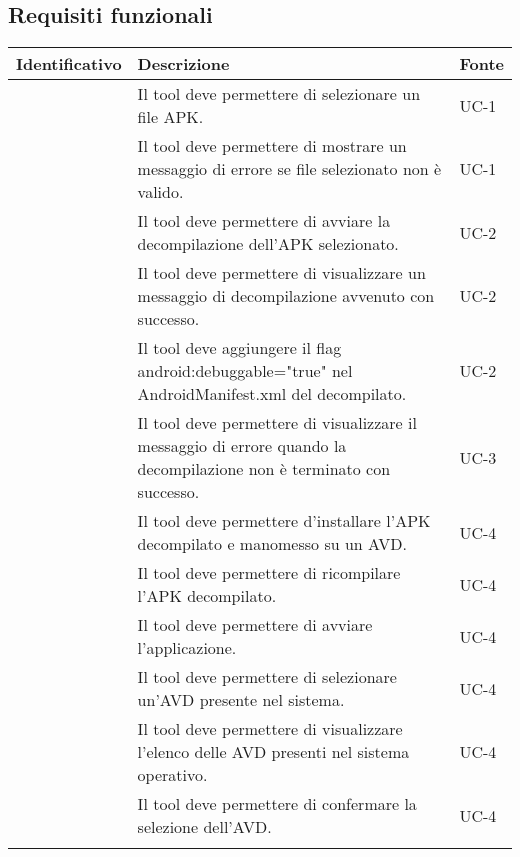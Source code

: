 \subsection{Requisiti funzionali}\label{subsec:requisiti-funzionali}
\begin{center}
    \begin{longtable}{ | c| C{7cm} |C{3cm} |}
        \hline
        \textbf{Identificativo} & \textbf{Descrizione} &\textbf{Fonte}\\\hline
         & Il tool deve permettere di selezionare un file APK.& UC-1\\\hline
         & Il tool deve permettere di mostrare un messaggio di errore se file selezionato non è valido.& UC-1\\\hline
        \setcounter{subCount}{0}

         & Il tool deve permettere di avviare la decompilazione dell'APK selezionato.& UC-2\\\hline
         & Il tool deve permettere di visualizzare un messaggio di decompilazione avvenuto con successo.& UC-2\\\hline
         & Il tool deve aggiungere il flag android:debuggable="true" nel AndroidManifest.xml del decompilato.& UC-2\\\hline
        \setcounter{subCount}{0}

         & Il tool deve permettere di visualizzare il messaggio di errore quando la decompilazione non è terminato con successo.& UC-3\\\hline
         & Il tool deve permettere d'installare l'APK decompilato e manomesso su un AVD. & UC-4 \\\hline
         & Il tool deve permettere di ricompilare l'APK decompilato.& UC-4\\\hline
         & Il tool deve permettere di avviare l'applicazione.& UC-4\\\hline

         & Il tool deve permettere di selezionare un'AVD presente nel sistema.& UC-4 \\\hline
         & Il tool deve permettere di visualizzare l'elenco delle AVD presenti nel sistema operativo.& UC-4\\\hline
         & Il tool deve permettere di confermare la selezione dell'AVD.& UC-4\\\hline
        \setcounter{subCount}{0}


\end{longtable}
\end{center}
